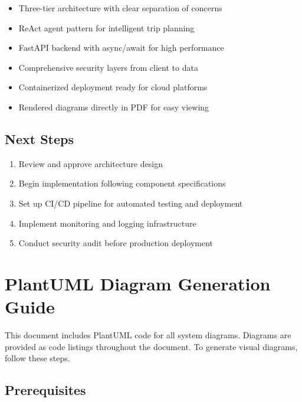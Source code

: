 \documentclass[12pt,a4paper]{report}
\begin{document}
\begin{itemize}
    \item Three-tier architecture with clear separation of concerns
    \item ReAct agent pattern for intelligent trip planning
    \item FastAPI backend with async/await for high performance  
    \item Comprehensive security layers from client to data
    \item Containerized deployment ready for cloud platforms
    \item Rendered diagrams directly in PDF for easy viewing
\end{itemize}

\section*{Next Steps}

\begin{enumerate}
    \item Review and approve architecture design
    \item Begin implementation following component specifications
    \item Set up CI/CD pipeline for automated testing and deployment
    \item Implement monitoring and logging infrastructure
    \item Conduct security audit before production deployment
\end{enumerate}


\appendix

\chapter{PlantUML Diagram Generation Guide}
\label{appendix:compilation}

This document includes PlantUML code for all system diagrams. Diagrams are provided as code listings throughout the document. To generate visual diagrams, follow these steps.

\section{Prerequisites}
\end{document}
